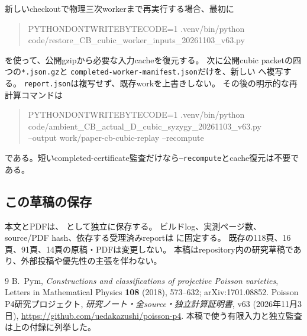 \documentclass[11pt,a4paper]{ltjsarticle}
\theoremstyle{definition}
\theoremstyle{remark}
\begin{document}
新しいcheckoutで物理三次workerまで再実行する場合、最初に
\begin{quote}\footnotesize\ttfamily
PYTHONDONTWRITEBYTECODE=1 .venv/bin/python\\
\hspace*{1em}code/restore\_CB\_cubic\_worker\_inputs\_20261103\_v63.py
\end{quote}
を使って、公開gzipから必要な入力cacheを復元する。
次に公開cubic packetの四つの\texttt{*.json.gz}と
\texttt{completed-worker-manifest.json}だけを、新しい
へ複写する。
\texttt{report.json}は複写せず、既存workを上書きしない。
その後の明示的な再計算コマンドは
\begin{quote}\footnotesize\ttfamily
PYTHONDONTWRITEBYTECODE=1 .venv/bin/python\\
\hspace*{1em}code/ambient\_CB\_actual\_D\_cubic\_syzygy\_20261103\_v63.py\\
\hspace*{1em}--output work/paper-cb-cubic-replay --recompute
\end{quote}
である。短いcompleted-certificate監査だけなら\texttt{--recompute}とcache復元は不要である。

\subsection{この草稿の保存}

本文とPDFは、
として独立に保存する。
ビルドlog、実測ページ数、source/PDF hash、依存する受理済みreportは
に固定する。
既存の118頁、16頁、91頁、14頁の原稿・PDFは変更しない。
本稿はrepository内の研究草稿であり、外部投稿や優先性の主張を伴わない。

\begin{thebibliography}{9}
B.~Pym, \emph{Constructions and classifications of projective Poisson varieties},
Letters in Mathematical Physics \textbf{108} (2018), 573--632;
arXiv:1701.08852.
Poisson P4研究プロジェクト,
\emph{研究ノート・全source・独立計算証明書}, v63 (2026年11月3日),
\url{https://github.com/uedakazushi/poisson-p4}.
本稿で使う有限入力と独立監査は上の付録に列挙した。
\end{thebibliography}
\end{document}
